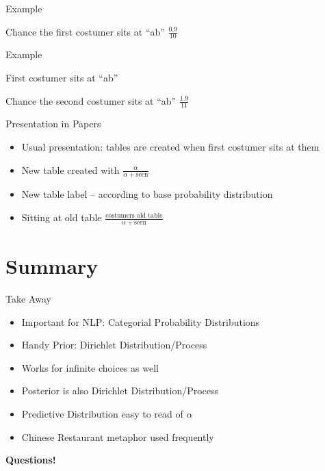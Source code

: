 \documentclass[11pt]{beamer}
\begin{document}
	\begin{frame}{Example}
		\centering
		
		\vspace{10pt} Chance the first costumer sits at ``ab'' $\frac{0.9}{10}$
	\end{frame}
	
	\begin{frame}{Example}
		\centering
		
		\vspace{10pt} First costumer sits at ``ab''
		
		\vspace{10pt} Chance the second costumer sits at ``ab'' $\frac{1.9}{11}$
	\end{frame}
	
	\begin{frame}{Presentation in Papers}
		\begin{itemize}
			\item Usual presentation: tables are created when first costumer sits at them
			\item New table created with $\frac{\alpha}{\alpha+\text{seen}}$
			\item New table label -- according to base probability distribution
			\item  Sitting at old table $\frac{\text{costumers old table}}{\alpha+\text{seen}}$
		\end{itemize}
	\end{frame}
	
	\section{Summary}
	
	\begin{frame}{Take Away}
		\begin{itemize}
			\item Important for NLP: Categorial Probability Distributions
			\item Handy Prior: Dirichlet Distribution/Process
			\item Works for infinite choices as well
			\item Posterior is also Dirichlet Distribution/Process
			\item Predictive Distribution easy to read of $\alpha$
			\item Chinese Restaurant metaphor used frequently
		\end{itemize}
	\end{frame}
	
	\begin{frame}
		\centering
		\begin{Large}
			\textbf{Questions!}
		\end{Large}
	\end{frame}
	
\end{document}
